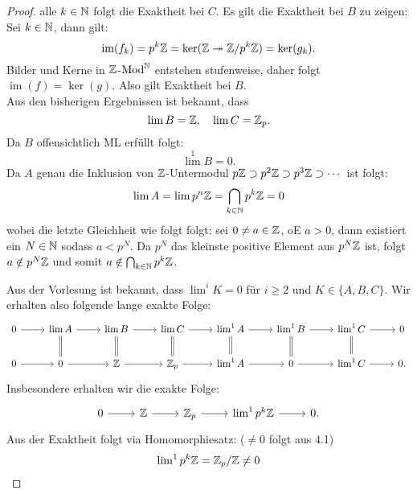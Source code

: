 \documentclass{nico_zettelsose21}
\newcommand{\Zpp}[1]{\Z/p^{#1}\Z}
\newcommand{\limD}{\operatorname{lim}}
\renewcommand{\im}{\operatorname{im}}
\newcommand{\Mod}{\operatorname{Mod}}
\begin{document}
\begin{enumerate}[(a)]
\begin{proof}
                alle $k \in \mathbb{N}$ folgt die Exaktheit bei $C$. Es gilt die Exaktheit bei $B$ zu zeigen: \\
                Sei $k \in \mathbb{N}$, dann gilt:
                \[
                    \im(f_{k}) = p^{k}\Z = \ker(\Z \twoheadrightarrow \Zpp{k}) = \ker(g_{k}).
                \] 
                Bilder und Kerne in $\mathbb{Z}$-$\Mod^{\N}$ entstehen stufenweise, daher folgt $\im(f) = \ker(g)$. Also gilt Exaktheit bei $B$. \\
                Aus den bisherigen Ergebnissen ist bekannt, dass 
                \[
                    \limD B = \Z, \ \ \ \limD C = \Z_{p}.
                \]
                Da $B$ offensichtlich ML erfüllt folgt:
                \[
                    \limD^{1} B = 0.
                \]
                Da $A$ genau die Inklusion von $\mathbb{Z}$-Untermodul $p\mathbb{Z} \supset p^{2}\mathbb{Z} \supset p^{3}\mathbb{Z} \supset \cdots$ ist folgt:
                \[
                   \limD A = \limD p^{n}\Z = \bigcap_{k \in \N} p^{k}\Z = 0
                \]
                wobei die letzte Gleichheit wie folgt folgt: sei $0 \neq a \in \mathbb{Z}$, oE $a>0$, dann existiert ein $N \in \mathbb{N}$
                sodass $a < p^{N}$. Da $p^{N}$ das kleinste positive Element aus $p^{N}\mathbb{Z}$ ist, folgt $a \notin p^{N}\mathbb{Z}$ und somit
                $a \notin \bigcap_{k \in \mathbb{N}} p^{k}\mathbb{Z}$. 
                
                Aus der Vorlesung ist bekannt, dass $\limD^{i} K = 0$ für $i \geq 2$ und $K \in \{A,B,C\}$. Wir erhalten also
                folgende lange exakte Folge:
                \[
                \begin{tikzcd}
                    0 \arrow[r] &\limD A \arrow[r] \arrow[d, equal] & \limD B \arrow[r] \arrow[d, equal] &\limD C \arrow[r] \arrow[d, equal] & \limD^{1} A \arrow[r] \arrow[d, equal] & \limD^{1} B \arrow[r] \arrow[d, equal] &\limD^{1} C \arrow[r] \arrow[d, equal]& 0 \\
                    0 \arrow[r] &0 \arrow[r] &\Z \arrow[r] &\Z_{p} \arrow[r] &\limD^{1}A \arrow[r] &0 \arrow[r] &\limD^{1} C \arrow[r] &0.
                \end{tikzcd}
                \]
                Insbesondere erhalten wir die exakte Folge:
                \[
                \begin{tikzcd}
                    0 \arrow[r] &\Z \arrow[r] &\Z_{p} \arrow[r] &\limD^{1} p^{k}\Z \arrow[r] &0.
                \end{tikzcd}
                \]
                Aus der Exaktheit folgt via Homomorphiesatz: ($\neq 0$ folgt aus 4.1)
                \[
                    \limD^{1} p^{k}\Z = \Z_{p}/\Z \neq 0
                \]

            \end{proof}
\end{enumerate}
\end{document}
